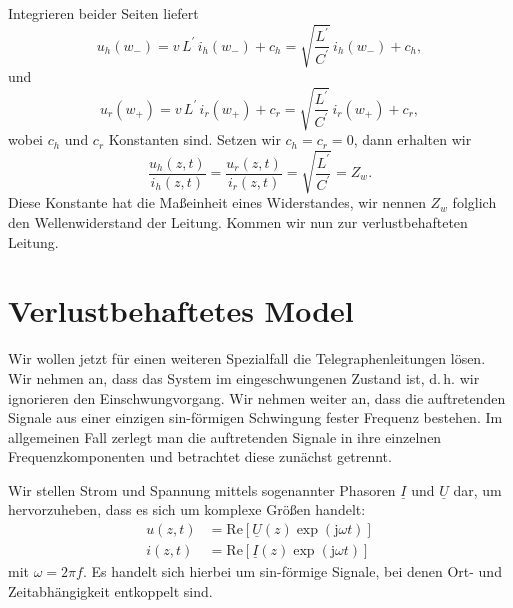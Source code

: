 \documentclass[paper=a4, parskip=half-, ngerman, fontsize=11pt]{scrreprt}
\begin{document}
Integrieren beider Seiten liefert
\begin{equation}
    u_{h}(w_{-}) = v \, L^{\prime} \, i_{h}(w_{-}) + c_{h} = \sqrt{\frac{L^{\prime}}{C^{\prime}}} \, i_{h}(w_{-}) +
    c_{h},
\end{equation}
und
\begin{equation}
    u_{r}(w_{+}) = v \, L^{\prime} \, i_{r}(w_{+}) + c_{r} = \sqrt{\frac{L^{\prime}}{C^{\prime}}} \, i_{r}(w_{+}) +
    c_{r},
\end{equation}
wobei $c_{h}$ und $c_{r}$ Konstanten sind. Setzen wir $c_{h} = c_{r} = 0$, dann erhalten wir
\begin{equation}
    \frac{u_{h}(z, t)}{i_{h}(z, t)} = \frac{u_{r}(z, t)}{i_{r}(z, t)} = \sqrt{\frac{L^{\prime}}{C^{\prime}}} = Z_{w}.
\end{equation}
Diese Konstante hat die Maßeinheit eines Widerstandes, wir nennen $Z_{w}$ folglich den Wellenwiderstand der Leitung.
Kommen wir nun zur verlustbehafteten Leitung.

\section{Verlustbehaftetes Model}
Wir wollen jetzt für einen weiteren Spezialfall die Telegraphenleitungen lösen. Wir nehmen an, dass das System im
eingeschwungenen Zustand ist, d.\,h. wir ignorieren den Einschwungvorgang. Wir nehmen weiter an, dass die auftretenden
Signale aus einer einzigen sin-förmigen Schwingung fester Frequenz bestehen. Im allgemeinen Fall zerlegt man die
auftretenden Signale in ihre einzelnen Frequenzkomponenten und betrachtet diese zunächst getrennt.

Wir stellen Strom und Spannung mittels sogenannter Phasoren $\underline{I}$ und $\underline{U}$ dar, um hervorzuheben,
dass es sich um komplexe Größen handelt:
\begin{align}
    u(z, t) &= \mathrm{Re} \left[ \underline{U}(z) \exp(\mathrm{j} \omega t) \right] \label{eq:Spannung} \\
    i(z, t) &= \mathrm{Re} \left[ \underline{I}(z) \exp(\mathrm{j} \omega t) \right]
\end{align}
mit $\omega = 2 \pi f$. Es handelt sich hierbei um sin-förmige Signale, bei denen Ort- und Zeitabhängigkeit entkoppelt
sind.
\end{document}
